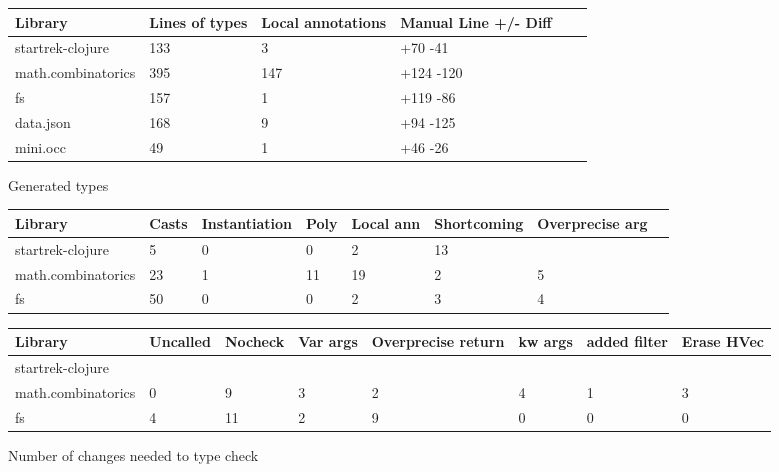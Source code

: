 \begin{figure*}
\begin{tabular}{| l | l | l | l | l | l |}
  Library            & Lines of types  & Local annotations & Manual Line +/- Diff \\
  \hline
  startrek-clojure   & 133             & 3                 & +70 -41 \\
  math.combinatorics & 395             & 147               & +124 -120\\
  fs                 & 157             & 1                 & +119 -86\\
  data.json          & 168             & 9                 & +94 -125 \\
  mini.occ           & 49              & 1                 & +46 -26\\
\end{tabular}
\caption{Generated types}
\end{figure*}

\begin{figure*}
\begin{tabular}{| l | l | l | l | l | l | l | l |}
  Library            & Casts & Instantiation & Poly & Local ann & Shortcoming & Overprecise arg \\
  \hline
  startrek-clojure   & 5     & 0             & 0    & 2         & 13          &               \\
  math.combinatorics & 23    & 1             & 11   & 19        & 2           & 5             \\
  fs                 & 50    & 0             & 0    & 2         & 3           & 4             \\
\end{tabular}
\begin{tabular}{| l | l | l | l | l | l | l | l |}
  Library            & Uncalled & Nocheck & Var args & Overprecise return & kw args & added filter & Erase HVec\\
  \hline
  startrek-clojure   & & & & & &               & \\
  math.combinatorics & 0        & 9       & 3        & 2                  & 4       & 1            & 3\\
  fs                 & 4        & 11      & 2        & 9                  & 0       & 0            & 0\\
\end{tabular}
\caption{Number of changes needed to type check}
\end{figure*}



